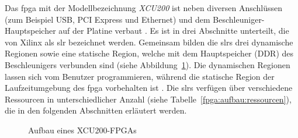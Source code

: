 Das \gls{fpga} mit der Modellbezeichnung \textit{XCU200} ist neben diversen
Anschlüssen (zum Beispiel USB, PCI Express und Ethernet) und dem
Beschleuniger-Hauptspeicher auf der Platine verbaut \cite[vgl.][2]{alveo2019}.
Es ist in drei Abschnitte unterteilt, die von Xilinx als \gls{slr} bezeichnet
werden. Gemeinsam bilden die \gls{slr}s drei dynamische Regionen sowie eine
statische Region, welche mit dem Hauptspeicher (DDR) des Beschleunigers
verbunden sind (siehe Abbildung~\ref{fpga:aufbau:alveoslr}). Die dynamischen
Regionen lassen sich vom Benutzer programmieren, während die statische Region
der Laufzeitumgebung des \gls{fpga} vorbehalten ist \cite[vgl.][4]{alveo2019}.
Die \gls{slr}s verfügen über verschiedene Ressourcen in unterschiedlicher
Anzahl (siehe Tabelle~\ref{fpga:aufbau:ressourcen}), die in den folgenden
Abschnitten erläutert werden.

\begin{figure}[htb]
    \centering
    \caption{Aufbau eines XCU200-FPGAs \cite[nach][5]{alveo2019}}
    \label{fpga:aufbau:alveoslr}
\end{figure}

